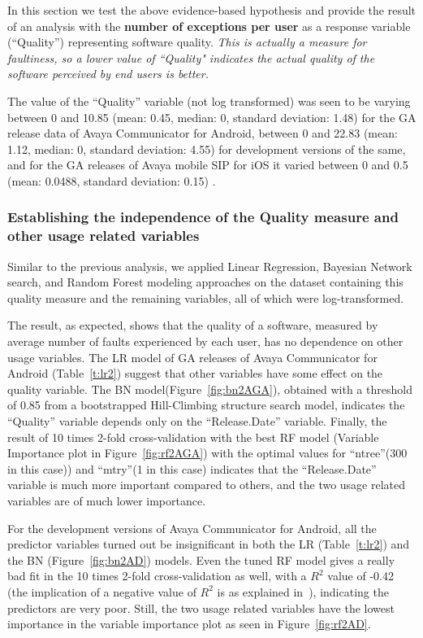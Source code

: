 \documentclass[smallcondensed]{svjour3}     %
\begin{document}
In this section we test the above evidence-based hypothesis and provide the result of an analysis with the \textbf{number of exceptions per user} as a response variable (``Quality'') representing software quality. 
\emph{This is actually a measure for faultiness, so a lower value of ``Quality" indicates the actual quality of the software perceived by end users is better.}

The value of the ``Quality'' variable (not log transformed) was seen to be varying between 0 and 10.85 (mean: 0.45, median: 0, standard deviation: 1.48) for the GA release data of Avaya Communicator for Android, between 0 and 22.83 (mean: 1.12, median: 0, standard deviation: 4.55) for development versions of the same, and for the GA releases of Avaya mobile SIP for iOS it varied between 0 and 0.5 (mean: 0.0488, standard deviation: 0.15) . %

\subsubsection{Establishing the independence of the Quality measure and other usage related variables}

Similar to the previous analysis, we applied Linear Regression, Bayesian Network search, and 
Random Forest modeling approaches on the dataset containing this quality measure and the remaining variables, all of which were log-transformed. 

The result, as expected, shows that the quality of a software, measured by average number of faults experienced by each user, has no dependence on other usage variables. 
The LR model of GA releases of Avaya Communicator for Android (Table~\ref{t:lr2}) suggest that other variables have some effect on the quality variable.
The BN model(Figure~\ref{fig:bn2AGA}), obtained with a threshold of 0.85 from a bootstrapped Hill-Climbing structure search model, indicates the ``Quality'' variable depends only on  the ``Release.Date'' variable.
Finally, the result of 10 times 2-fold cross-validation with the best RF model (Variable Importance plot in Figure~\ref{fig:rf2AGA}) with the optimal values for ``ntree''(300 in this case)) and ``mtry''(1 in this case)  indicates that the ``Release.Date'' variable is much more important compared to others, and the two usage related variables are of much lower importance. 

For the development versions of Avaya Communicator for Android, all the predictor variables turned out be insignificant in both the LR (Table~\ref{t:lr2}) and the BN (Figure~\ref{fig:bn2AD}) models. Even the tuned RF model gives a really bad fit in the 10 times 2-fold cross-validation as well, with a $R^2$ value of -0.42 (the implication of a negative value of $R^2$ is as explained in~\cite{negRsq}), indicating the predictors are very poor. Still, the two usage related variables have the lowest importance in the variable importance plot as seen in Figure~\ref{fig:rf2AD}. 
\end{document}
